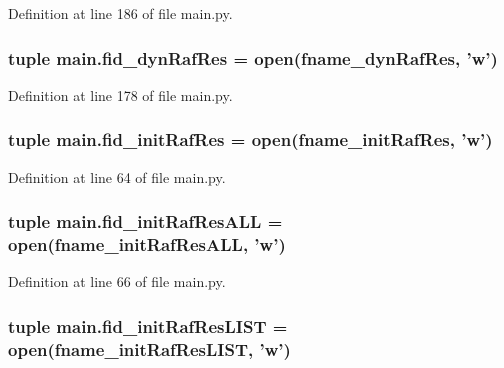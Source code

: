 Definition at line 186 of file main.\+py.

\hypertarget{a00153_aaff6b4fb4c2e2089c2a207a12f1757e3}{
\subsubsection[{fid\+\_\+dyn\+Raf\+Res}]{\setlength{\rightskip}{0pt plus 5cm}tuple main.\+fid\+\_\+dyn\+Raf\+Res = open({\bf fname\+\_\+dyn\+Raf\+Res}, 'w')}}\label{a00153_aaff6b4fb4c2e2089c2a207a12f1757e3}


Definition at line 178 of file main.\+py.

\hypertarget{a00153_a98d514a663f6bedde329d0bbbd2b78fa}{
\subsubsection[{fid\+\_\+init\+Raf\+Res}]{\setlength{\rightskip}{0pt plus 5cm}tuple main.\+fid\+\_\+init\+Raf\+Res = open({\bf fname\+\_\+init\+Raf\+Res}, 'w')}}\label{a00153_a98d514a663f6bedde329d0bbbd2b78fa}


Definition at line 64 of file main.\+py.

\hypertarget{a00153_a45aeb03f0d9cc30cb0a490354fd76d6c}{
\subsubsection[{fid\+\_\+init\+Raf\+Res\+A\+L\+L}]{\setlength{\rightskip}{0pt plus 5cm}tuple main.\+fid\+\_\+init\+Raf\+Res\+A\+L\+L = open({\bf fname\+\_\+init\+Raf\+Res\+A\+L\+L}, 'w')}}\label{a00153_a45aeb03f0d9cc30cb0a490354fd76d6c}


Definition at line 66 of file main.\+py.

\hypertarget{a00153_ae24c607a37f0f3f23d7e87f6bb4fe45b}{
\subsubsection[{fid\+\_\+init\+Raf\+Res\+L\+I\+S\+T}]{\setlength{\rightskip}{0pt plus 5cm}tuple main.\+fid\+\_\+init\+Raf\+Res\+L\+I\+S\+T = open({\bf fname\+\_\+init\+Raf\+Res\+L\+I\+S\+T}, 'w')}}\label{a00153_ae24c607a37f0f3f23d7e87f6bb4fe45b}


